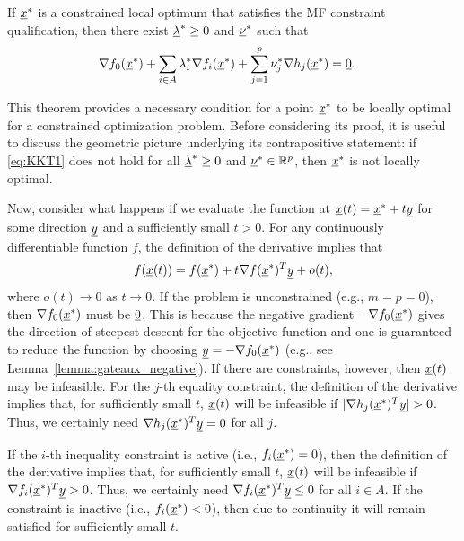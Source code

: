\begin{theorem}
\label{theorem:KKT}
If $\underline{x}^*$ is a constrained local optimum that satisfies the MF constraint qualification, then there exist $\underline{\lambda}^* \geq 0$ and $\underline{\nu}^*$ such that
\begin{align}
\label{eq:KKT1} \nabla f_0 (\underline{x}^*) + \sum_{i\in A} \lambda_i^* \nabla f_i (\underline{x}^*) + \sum_{j=1}^p \nu_j^* \nabla h_j (\underline{x}^*) &= \underline{0}.
\end{align}
\end{theorem}

This theorem provides a necessary condition for a point $\underline{x}^*$ to be locally optimal for a constrained optimization problem.
Before considering its proof, it is useful to discuss the geometric picture underlying its contrapositive statement: if \eqref{eq:KKT1} does not hold for all $\underline{\lambda}^* \geq 0$ and $\underline{\nu}^* \in \mathbb{R}^p$, then $\underline{x}^*$ is not locally optimal.

Now, consider what happens if we evaluate the function at $\underline{x}(t) = \underline{x}^* + t \underline{y}$ for some direction $\underline{y}$ and a sufficiently small $t>0$.
For any continuously differentiable function $f$, the definition of the derivative implies that
\[ f(\underline{x}(t)) = f(\underline{x}^*)+t \nabla f(\underline{x}^*)^T \underline{y} + o(t), \]
where $o(t) \to 0$ as $t \to 0$.
If the problem is unconstrained (e.g., $m=p=0$), then $\nabla f_0 (\underline{x}^*)$ must be $\underline{0}$.
This is because the negative gradient $-\nabla f_0 (\underline{x}^*)$ gives the direction of steepest descent for the objective function and one is guaranteed to reduce the function by choosing $\underline{y}=-\nabla f_0 (\underline{x}^*)$ (e.g., see Lemma~\ref{lemma:gateaux_negative}).
If there are constraints, however, then $\underline{x}(t)$ may be infeasible.
For the $j$-th equality constraint, the definition of the derivative implies that, for sufficiently small $t$, $\underline{x}(t)$ will be infeasible if $|\nabla h_j (\underline{x}^*)^T \underline{y} | > 0$.
Thus, we certainly need $\nabla h_j (\underline{x}^*)^T \underline{y}  = 0$ for all $j$.


If the $i$-th inequality constraint is active (i.e., $f_i (\underline{x}^*)=0$), then the definition of the derivative implies that, for sufficiently small $t$, $\underline{x}(t)$ will be infeasible if $\nabla f_i (\underline{x}^*)^T \underline{y}  > 0$.
Thus, we certainly need $\nabla f_i (\underline{x}^*)^T \underline{y}  \leq 0$ for all $i\in A$. 
If the constraint is inactive (i.e., $f_i (\underline{x}^*)<0$), then due to continuity it will remain satisfied for sufficiently small $t$.
 

